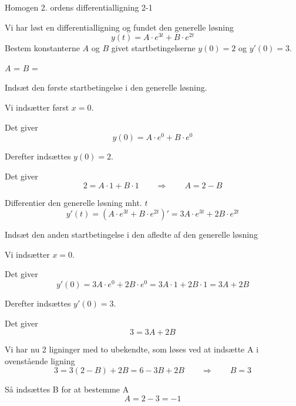 \documentclass{article}
\begin{document}
\begin{exercise}{Homogen 2. ordens differentialligning 2-1}
	
	Vi har løst en differentialligning og fundet den generelle løsning
	\[
	y(t) = A \cdot e^{3t} + B \cdot e^{2t}
	\]
	Bestem konstanterne $A$ og $B$ givet startbetingelserne $y(0)=2$ og $y'(0)=3$.
	
	
	$A$ = 		
$B$ = 
	
	\hint
	
	Indsæt den første startbetingelse i den generelle løsning. 
	
	
	\hint
	
	Vi indsætter først $x=0$.
	
	\hint
	
	Det giver
	\[
	y(0)=  A \cdot e^{0} + B \cdot e^{0}
	\]
	
	\hint
	
	Derefter indsættes $y(0)=2$.
	
	\hint 
	
	Det giver 
	\[
	2= A \cdot 1 + B \cdot 1 \qquad \Rightarrow \qquad A = 2 - B
	\]
	
	\hint 
	
	Differentier den generelle løsning mht. $t$
	\[
	y'(t)= \left(A \cdot e^{3t} + B \cdot e^{2t} \right)' = 3A \cdot e^{3t} + 2B \cdot e^{2t} 
	\]
	
	\hint 
	
	Indsæt den anden startbetingelse i den afledte af den generelle løsning
	
	\hint
	
	Vi indsætter $x=0$.
	
	\hint 
	
	Det giver
	\[
	y'(0) = 3A \cdot e^{0} + 2B \cdot e^{0} =  3A \cdot 1 + 2B \cdot 1  = 3A + 2B
		\]
	
	\hint 
	
	Derefter indsættes $y'(0)=3$.	
	\hint
	
	Det giver
	\[
	3 = 3A+ 2B 
	\]
	
	\hint 
	
	Vi har nu 2 ligninger med to ubekendte, som løses ved at indsætte A i ovenstående ligning
	\[
	3 = 3(2-B) + 2B = 6 - 3B + 2B \qquad \Rightarrow \qquad B = 3
	\]
		
	\hint
	
	Så indsættes B for at bestemme A
	\[
	A = 2 - 3 = -1
	\]
	
\end{exercise}

\newpage
\end{document}
